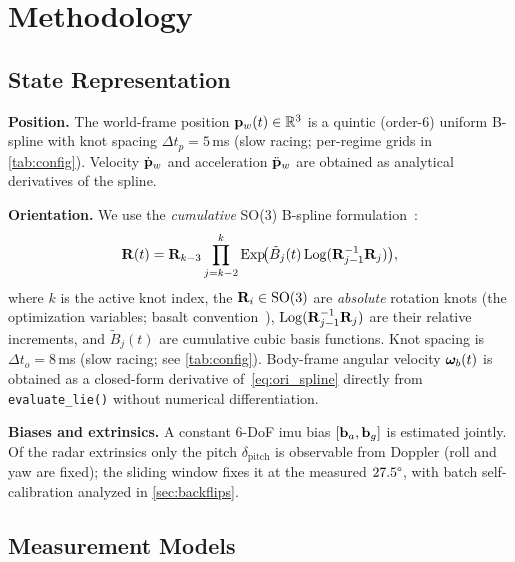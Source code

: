 \section{Methodology}
\label{sec:method}

\subsection{State Representation}
\label{sec:state}

\textbf{Position.}
The world-frame position $\mathbf{p}_w(t) \in \mathbb{R}^3$ is a quintic
(order-6) uniform B-spline with knot spacing $\Delta t_p = 5$\,ms
(slow racing; per-regime grids in \autoref{tab:config}).
Velocity $\dot{\mathbf{p}}_w$ and acceleration $\ddot{\mathbf{p}}_w$ are
obtained as analytical derivatives of the spline.

\textbf{Orientation.}
We use the \emph{cumulative} SO(3) B-spline
formulation~\cite{sommer2020efficient,usenko2020basalt}:
\begin{equation}
  \mathbf{R}(t) = \mathbf{R}_{k-3}
           \prod_{j=k-2}^{k} \mathrm{Exp}\!\bigl(\tilde{B}_j(t)\,
           \mathrm{Log}(\mathbf{R}_{j-1}^{-1}\mathbf{R}_{j})\bigr),
  \label{eq:ori_spline}
\end{equation}
where $k$ is the active knot index, the $\mathbf{R}_i \in \mathrm{SO}(3)$ are \emph{absolute}
rotation knots (the optimization variables; basalt
convention~\cite{usenko2020basalt}), $\mathrm{Log}(\mathbf{R}_{j-1}^{-1}\mathbf{R}_j)$ are their
relative increments, and $\tilde{B}_j(t)$ are cumulative cubic basis
functions.  Knot spacing is $\Delta t_o = 8$\,ms (slow racing; see
\autoref{tab:config}).
Body-frame angular velocity $\boldsymbol{\omega}_b(t)$
is obtained as a closed-form derivative of~\eqref{eq:ori_spline}
directly from \texttt{evaluate\_lie()} without numerical
differentiation.

\textbf{Biases and extrinsics.}
A constant 6-DoF \ac{imu} bias $[\mathbf{b}_a, \mathbf{b}_g]$ is estimated jointly.
Of the radar extrinsics only the pitch $\delta_\text{pitch}$
is observable from Doppler (roll and yaw are fixed); the sliding window fixes
it at the measured $27.5\degree$, with batch self-calibration analyzed in
\autoref{sec:backflips}.

\subsection{Measurement Models}
\label{sec:models}


